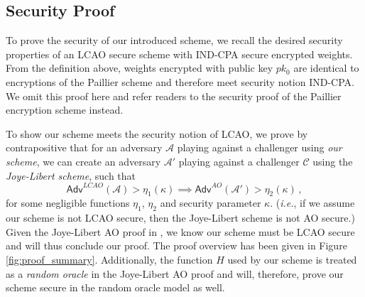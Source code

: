\documentclass[10pt,letterpaper,oneside,twocolumn,journal]{IEEEtran}
\theoremstyle{definition}
\theoremstyle{definition}
\theoremstyle{remark}
\begin{document}
% 
% 

\subsection{Security Proof}
To prove the security of our introduced scheme, we recall the desired security properties of an LCAO secure scheme with IND-CPA secure encrypted weights. From the definition above, weights encrypted with public key $pk_0$ are identical to encryptions of the Paillier scheme and therefore meet security notion IND-CPA. We omit this proof here and refer readers to the security proof of the Paillier encryption scheme \cite{paillierPublicKeyCryptosystemsBased1999} instead.

To show our scheme meets the security notion of LCAO, we prove by contrapositive that for an adversary $\mathcal{A}$ playing against a challenger using \textit{our scheme}, we can create an adversary $\mathcal{A}'$ playing against a challenger $\mathcal{C}$ using the \textit{Joye-Libert scheme}, such that
\begin{equation*}
    \mathsf{Adv}^{LCAO}(\mathcal{A}) > \eta_1(\kappa) \implies \mathsf{Adv}^{AO}(\mathcal{A}') > \eta_2(\kappa)\,,
\end{equation*}
for some negligible functions $\eta_1$, $\eta_2$ and security parameter $\kappa$. (\textit{i.e.}, if we assume our scheme is not LCAO secure, then the Joye-Libert scheme is not AO secure.) Given the Joye-Libert AO proof in \cite{joyeScalableSchemePrivacyPreserving2013}, we know our scheme must be LCAO secure and will thus conclude our proof. The proof overview has been given in Figure \ref{fig:proof_summary}. Additionally, the function $H$ used by our scheme is treated as a \textit{random oracle} in the Joye-Libert AO proof and will, therefore, prove our scheme secure in the random oracle model as well.
\end{document}
